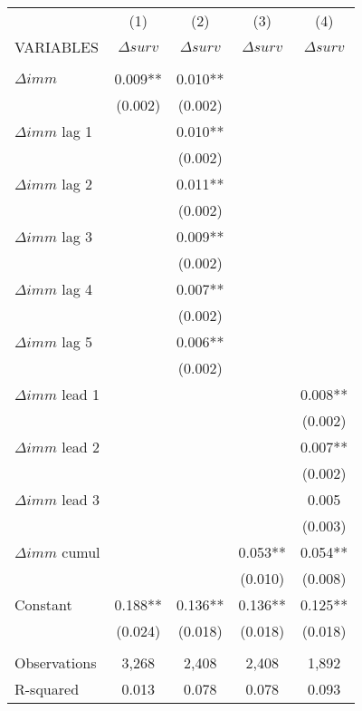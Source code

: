 
\begin{tabular}{lcccc} \hline
 & (1) & (2) & (3) & (4) \\
VARIABLES & $\Delta surv$ & $\Delta surv$ & $\Delta surv$ & $\Delta surv$ \\ \hline
 &  &  &  &  \\
$\Delta imm$ & 0.009** & 0.010** &  &  \\
 & (0.002) & (0.002) &  &  \\
$\Delta imm$ lag 1 &  & 0.010** &  &  \\
 &  & (0.002) &  &  \\
$\Delta imm$ lag 2 &  & 0.011** &  &  \\
 &  & (0.002) &  &  \\
$\Delta imm$ lag 3 &  & 0.009** &  &  \\
 &  & (0.002) &  &  \\
$\Delta imm$ lag 4 &  & 0.007** &  &  \\
 &  & (0.002) &  &  \\
$\Delta imm$ lag 5 &  & 0.006** &  &  \\
 &  & (0.002) &  &  \\
$\Delta imm$ lead 1 &  &  &  & 0.008** \\
 &  &  &  & (0.002) \\
$\Delta imm$ lead 2 &  &  &  & 0.007** \\
 &  &  &  & (0.002) \\
$\Delta imm$ lead 3 &  &  &  & 0.005 \\
 &  &  &  & (0.003) \\
$\Delta imm$ cumul &  &  & 0.053** & 0.054** \\
 &  & & (0.010) & (0.008) \\
Constant & 0.188** & 0.136** & 0.136** & 0.125** \\
 & (0.024) & (0.018) & (0.018) & (0.018) \\
 &  &  &  &  \\
Observations & 3,268 & 2,408 & 2,408 & 1,892 \\
 R-squared & 0.013 & 0.078 & 0.078 & 0.093 \\ \hline
\end{tabular}
